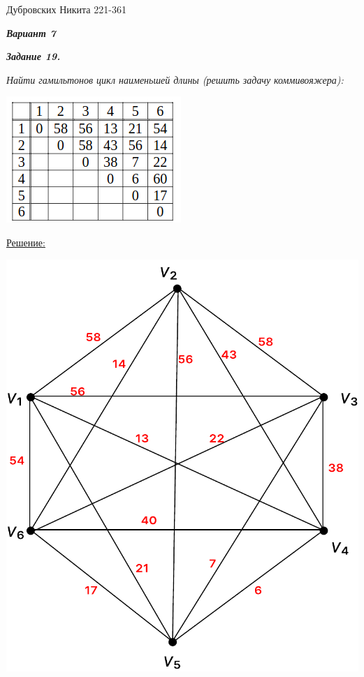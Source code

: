 \documentclass[12pt]{article}
\begin{document}
Дубровских Никита 221-361

\textit{\textbf{Вариант 7}}

\textit{\textbf{Задание 19.}}

\textit{Найти гамильтонов цикл наименьшей длины (решить задачу
коммивояжера):}

\begin{center}
	\includegraphics[scale=.8]{19.png}
\end{center}

\underline{Решение:}

\begin{center}
\includegraphics[scale=.6]{19_1.pdf}
\end{center}
\end{document}

